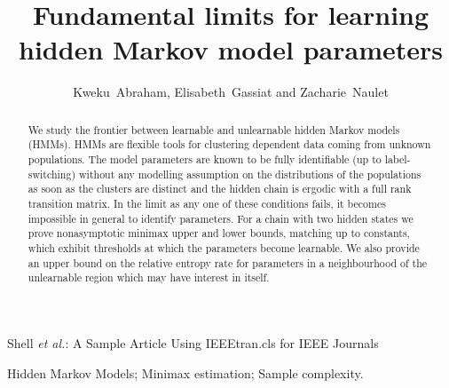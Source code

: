 \documentclass[journal]{IEEEtran}
\newcommand{\1}{\boldsymbol{1}}
\begin{document}
\title{Fundamental limits for learning hidden Markov model parameters}

\author{Kweku~Abraham, Elisabeth~Gassiat and Zacharie~Naulet}

%
{Shell \MakeLowercase{\textit{et al.}}: A Sample Article Using IEEEtran.cls for IEEE Journals}


\maketitle

\begin{abstract}
  We study the frontier between learnable and unlearnable hidden Markov models
  (HMMs). HMMs are flexible tools for clustering dependent data coming from
  unknown populations. The model parameters are known to be fully identifiable
  (up to label-switching) without any modelling assumption on the distributions
  of the populations as soon as the clusters are distinct and the hidden chain
  is ergodic with a full rank transition matrix. In the limit as any one of
  these conditions fails, it becomes impossible in general to identify
  parameters. For a chain with two hidden states we prove nonasymptotic minimax
  upper and lower bounds, matching up to constants, which exhibit thresholds at
  which the parameters become learnable. We also provide an upper bound on the
  relative entropy rate for parameters in a neighbourhood of the unlearnable
  region which may have interest in itself.
\end{abstract}

\begin{IEEEkeywords}
Hidden Markov Models; Minimax estimation; Sample complexity.
\end{IEEEkeywords}


%
\IEEEpeerreviewmaketitle
\end{document}
